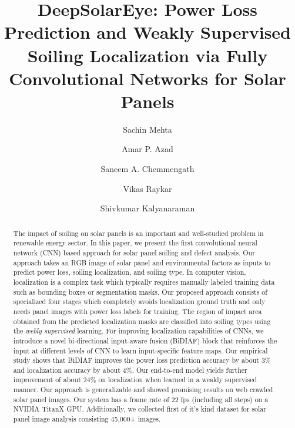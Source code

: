 \documentclass[10pt,twocolumn,letterpaper]{article}
\begin{document}
\title{DeepSolarEye: Power Loss Prediction and Weakly Supervised Soiling Localization via Fully Convolutional Networks for Solar Panels}


\author[1]{Sachin Mehta}
\author[2]{Amar P. Azad}
\author[2]{Saneem A. Chemmengath}
\author[2]{Vikas Raykar}
\author[2]{Shivkumar Kalyanaraman}

\maketitle
\ifwacvfinal\thispagestyle{empty}\fi


\begin{abstract}
The impact of soiling on solar panels is an important and well-studied problem in renewable energy sector. In this paper, we present the first convolutional neural network (CNN) based approach for solar panel soiling and defect analysis. Our approach takes an RGB image of solar panel and environmental factors as inputs to predict power loss, soiling localization, and soiling type. In computer vision, localization is a complex task which typically requires manually labeled training data such as bounding boxes or segmentation masks. Our proposed approach consists of specialized four stages which completely avoids localization ground truth and only needs panel images with power loss labels for training. The region of impact area obtained from the predicted localization masks are classified into soiling types using the \textit{webly supervised} learning. For improving localization capabilities of CNNs, we introduce a novel bi-directional input-aware fusion (BiDIAF) block that reinforces the input at different levels of CNN to learn input-specific feature maps. Our empirical study shows that BiDIAF improves the power loss prediction accuracy by about 3\%  and localization accuracy by about 4\%. Our end-to-end model yields further improvement of about 24\% on localization when learned in a weakly supervised manner. Our approach is generalizable and showed promising results on web crawled solar panel images. Our system has a frame rate of 22 fps (including all steps) on a NVIDIA TitanX GPU. Additionally, we collected first of it's kind dataset for solar panel image analysis consisting 45,000+ images.
\end{abstract}
\end{document}
